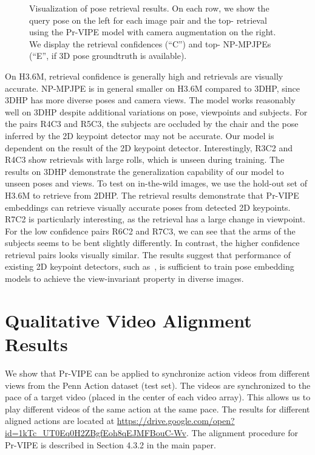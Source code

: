 \begin{figure*}
\begin{tabular}{cccccc}
\end{tabular}
\caption{Visualization of pose retrieval results. On each row, we show the query pose on the left for each image pair and the top- retrieval using the Pr-VIPE model with camera augmentation on the right. We display the retrieval confidences (``C'') and top- NP-MPJPEs (``E'', if 3D pose groundtruth is available).}
\label{fig:supp_retrieval}
\vspace{-0.2cm}
\end{figure*}
 
On H3.6M, retrieval confidence is generally high and retrievals are visually accurate. NP-MPJPE is in general smaller on H3.6M compared to 3DHP, since 3DHP has more diverse poses and camera views. The model works reasonably well on 3DHP despite additional variations on pose, viewpoints and subjects. For the pairs R4C3 and R5C3, the subjects are occluded by the chair and the pose inferred by the 2D keypoint detector may not be accurate. Our model is dependent on the result of the 2D keypoint detector. Interestingly, R3C2 and R4C3 show retrievals with large rolls, which is unseen during training. The results on 3DHP demonstrate the generalization capability of our model to unseen poses and views. To test on in-the-wild images, we use the hold-out set of H3.6M to retrieve from 2DHP. The retrieval results demonstrate that Pr-VIPE embeddings can retrieve visually accurate poses from detected 2D keypoints. R7C2 is particularly interesting, as the retrieval has a large change in viewpoint. For the low confidence pairs R6C2 and R7C3, we can see that the arms of the subjects seems to be bent slightly differently. In contrast, the higher confidence retrieval pairs looks visually similar. The results suggest that performance of existing 2D keypoint detectors, such as~\cite{papandreou2018personlab}, is sufficient to train pose embedding models to achieve the view-invariant property in diverse images.

\section{Qualitative Video Alignment Results}\label{sec:video_alignment_qres}

We show that Pr-VIPE can be applied to synchronize action videos from different views from the Penn Action dataset (test set). The videos are synchronized to the pace of a target video (placed in the center of each video array). This allows us to play different videos of the same action at the same pace. The results for different aligned actions are located at \url{https://drive.google.com/open?id=1kTc_UT0Eq0H2ZBgfEoh8qEJMFBouC-Wv}. The alignment procedure for Pr-VIPE is described in Section 4.3.2 in the main paper.

